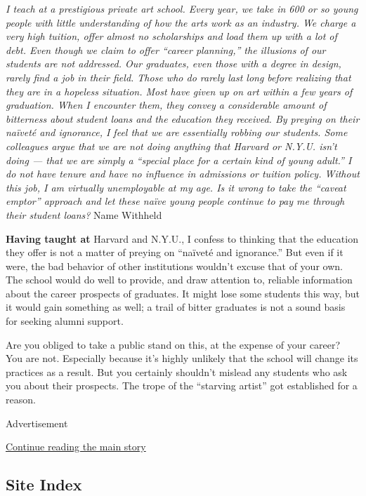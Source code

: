 \emph{I teach at a prestigious private art school. Every year, we take
in 600 or so young people with little understanding of how the arts work
as an industry. We charge a very high tuition, offer almost no
scholarships and load them up with a lot of debt. Even though we claim
to offer ``career planning,'' the illusions of our students are not
addressed. Our graduates, even those with a degree in design, rarely
find a job in their field. Those who do rarely last long before
realizing that they are in a hopeless situation. Most have given up on
art within a few years of graduation. When I encounter them, they convey
a considerable amount of bitterness about student loans and the
education they received. By preying on their naïveté and ignorance, I
feel that we are essentially robbing our students. Some colleagues argue
that we are not doing anything that Harvard or N.Y.U. isn't doing ---
that we are simply a ``special place for a certain kind of young
adult.'' I do not have tenure and have no influence in admissions or
tuition policy. Without this job, I am virtually unemployable at my age.
Is it wrong to take the ``caveat emptor'' approach and let these naïve
young people continue to pay me through their student loans?} Name
Withheld

\textbf{Having taught at} Harvard and N.Y.U., I confess to thinking that
the education they offer is not a matter of preying on ``naïveté and
ignorance.'' But even if it were, the bad behavior of other institutions
wouldn't excuse that of your own. The school would do well to provide,
and draw attention to, reliable information about the career prospects
of graduates. It might lose some students this way, but it would gain
something as well; a trail of bitter graduates is not a sound basis for
seeking alumni support.

Are you obliged to take a public stand on this, at the expense of your
career? You are not. Especially because it's highly unlikely that the
school will change its practices as a result. But you certainly
shouldn't mislead any students who ask you about their prospects. The
trope of the ``starving artist'' got established for a reason.

Advertisement

\protect\hyperlink{after-bottom}{Continue reading the main story}

\hypertarget{site-index}{%
\subsection{Site Index}\label{site-index}}

